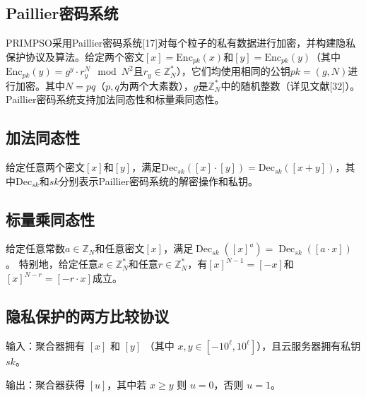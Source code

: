 \subsection{Paillier密码系统}
PRIMPSO采用Paillier密码系统[17]对每个粒子的私有数据进行加密，并构建隐私保护协议及算法。给定两个密文\([x] = \text{Enc}_{pk}(x)\)和\([y] = \text{Enc}_{pk}(y)\)（其中\(\text{Enc}_{pk}(y) = g^y \cdot r_y^N \mod N^2\)且\(r_y \in \mathbb{Z}_N^*\)），它们均使用相同的公钥\(pk = (g, N)\)进行加密。其中\(N = pq\)（\(p, q\)为两个大素数），\(g\)是\(\mathbb{Z}_N^*\)中的随机整数（详见文献[32]）。Paillier密码系统支持加法同态性和标量乘同态性。

\subsection{加法同态性}
给定任意两个密文\([x]\)和\([y]\)，满足\(\text{Dec}_{sk}([x] \cdot [y]) = \text{Dec}_{sk}([x + y])\)，其中\(\text{Dec}_{sk}\)和\(sk\)分别表示Paillier密码系统的解密操作和私钥。

\subsection{标量乘同态性}
给定任意常数\(a \in \mathbb{Z}_N\)和任意密文\([x]\)，满足\(\operatorname{Dec}_{sk}([x]^a) = \operatorname{Dec}_{sk}([a \cdot x])\)。  
特别地，给定任意\(x \in \mathbb{Z}_N^*\)和任意\(r \in \mathbb{Z}_N^*\)，有\([x]^{N-1} = [-x]\)和\([x]^{N-r} = [-r \cdot x]\)成立。

\subsection{隐私保护的两方比较协议}
输入：聚合器拥有 \([x]\) 和 \([y]\) （其中 \(x, y \in [-10^\ell, 10^\ell]\)），且云服务器拥有私钥 \(sk\)。

输出：聚合器获得 \([u]\)，其中若 \(x \geq y\) 则 \(u = 0\)，否则 \(u = 1\)。

